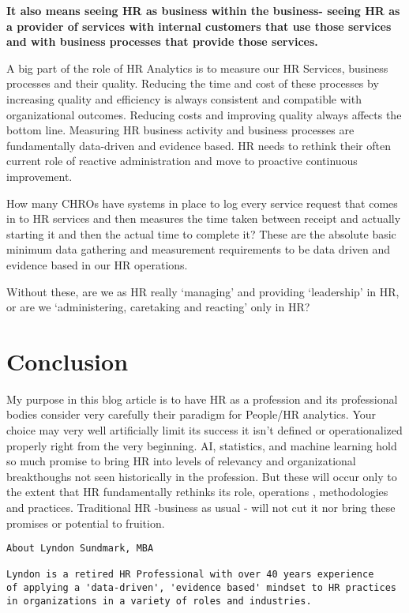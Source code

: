 \documentclass[12pt,letterpaper]{article}
\begin{document}
\textbf{It also means seeing HR as business within the business- seeing
HR as a provider of services with internal customers that use those
services and with business processes that provide those services.}

A big part of the role of HR Analytics is to measure our HR Services,
business processes and their quality. Reducing the time and cost of
these processes by increasing quality and efficiency is always
consistent and compatible with organizational outcomes. Reducing costs
and improving quality always affects the bottom line. Measuring HR
business activity and business processes are fundamentally data-driven
and evidence based. HR needs to rethink their often current role of
reactive administration and move to proactive continuous improvement.

How many CHROs have systems in place to log every service request that
comes in to HR services and then measures the time taken between receipt
and actually starting it and then the actual time to complete it? These
are the absolute basic minimum data gathering and measurement
requirements to be data driven and evidence based in our HR operations.

Without these, are we as HR really `managing' and providing `leadership'
in HR, or are we `administering, caretaking and reacting' only in HR?

\section{Conclusion}\label{conclusion}

My purpose in this blog article is to have HR as a profession and its
professional bodies consider very carefully their paradigm for People/HR
analytics. Your choice may very well artificially limit its success it
isn't defined or operationalized properly right from the very beginning.
AI, statistics, and machine learning hold so much promise to bring HR
into levels of relevancy and organizational breakthoughs not seen
historically in the profession. But these will occur only to the extent
that HR fundamentally rethinks its role, operations , methodologies and
practices. Traditional HR -business as usual - will not cut it nor bring
these promises or potential to fruition.


\begin{verbatim}
About Lyndon Sundmark, MBA

Lyndon is a retired HR Professional with over 40 years experience
of applying a 'data-driven', 'evidence based' mindset to HR practices
in organizations in a variety of roles and industries.
\end{verbatim}
\end{document}
